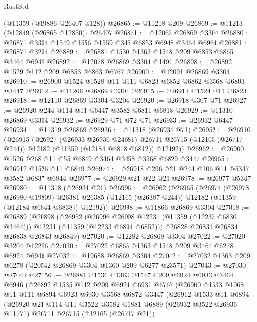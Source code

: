 \begin{lexlean}{RustStd}
\begin{coremodule}
{{{{{{{{{{{{{{{{{{{    (@11359 (@19886 @26407 @128))
@26865 := @11218 @209
@26869 := @11213 (@12849 (@26865 @12850)) @26407
@26871 := @12063 @26869 @3304
@26880 := @26871 @3304 @1549 @1556 @1559 @345 @6853 @6948 @3464 @6964
@26881 := @26871 @3204
@26889 := @26881 @1530 @1363 @1548 @209 @6853 @6865 @3464 @6948
@26892 := @12078 @26869 @3304 @1491
@26898 := @26892 @1529 @112 @209 @6853 @6863 @6767
@26900 := @12091 @26869 @3304
@26910 := @26900 @1524 @1528 @11 @111 @6823 @6852 @6862 @3568 @6803 @3447
@26912 := @11266 @26869 @3304
@26915 := @26912 @1524 @11 @6823
@26918 := @12110 @26869 @3304 @3204
@26920 := @26918 @307 @71
@26927 := @26920 @244 @114 @11 @6447 @3582 @6811 @6818
@26929 := @11310 @26869 @3304
@26932 := @26929 @71 @72 @71
@26933 := @26932 @6447
@26934 := @11319 @26869
@26936 := @11318 (@26934 @71)
@26952 := @26910
    (@26915
      (@26927
        (@26933 @26936 @24681)
        @26711
        @26715
        (@12165 (@26717 @244))
        @12182
        (@11359 (@12184 @6818 @6812))
        @12192))
@26962 := @26900 @1526 @268 @11 @55 @6849 @3464 @3458 @3568 @6829 @3447
@26965 := @26912 @1526 @11 @6849
@26974 := @26918 @296 @21 @244 @106 @11 @5347 @3582 @6837 @6844
@26977 := @26929 @21 @22 @21
@26978 := @26977 @5347
@26980 := @11318 (@26934 @21)
@26996 := @26962
    (@26965
      (@26974
        (@26978 @26980 @19809)
        @26381
        @26385
        (@12165 (@26387 @244))
        @12182
        (@11359 (@12184 @6844 @6838))
        @12192))
@26998 := @11866 @26869 @3304
@27018 := @26889
    (@26898
      (@26952
        (@26996 @26998 @12231 (@11359 (@12233 @6830 @3464)))
        @12231
        (@11359 (@12233 @6804 @6852)))
      @26828
      @26831
      @26834
      @26838
      @26843
      @26849)
@27020 := @12282 @26869 @3304
@27022 := @27020 @3204 @12286
@27030 := @27022 @6865 @1363 @1548 @209 @3464 @6278 @6924 @6946
@27032 := @19688 @26869 @3304
@27042 := @27032 @1363 @209 @6278 (@20542 @26869 @3304 @1360 @209 @6277 @23571)
@27043 := @27030 @27042
@27156 := @26881
    @1536
    @1363
    @1547
    @209
    @6924
    @6933
    @3464
    @6946
    (@26892
      @1535
      @112
      @209
      @6924
      @6931
      @6767
      (@26900
        @1533
        @1068
        @11
        @111
        @6894
        @6923
        @6930
        @3568
        @6872
        @3447
        (@26912
          @1533
          @11
          @6894
          (@26920
            @21
            @114
            @11
            @3522
            @3582
            @6881
            @6889
            (@26932 @3522 @26936 @11771)
            @26711
            @26715
            (@12165 (@26717 @21))
}}}}}}}}}}}}}}}}}}}
\end{coremodule}
\end{lexlean}

